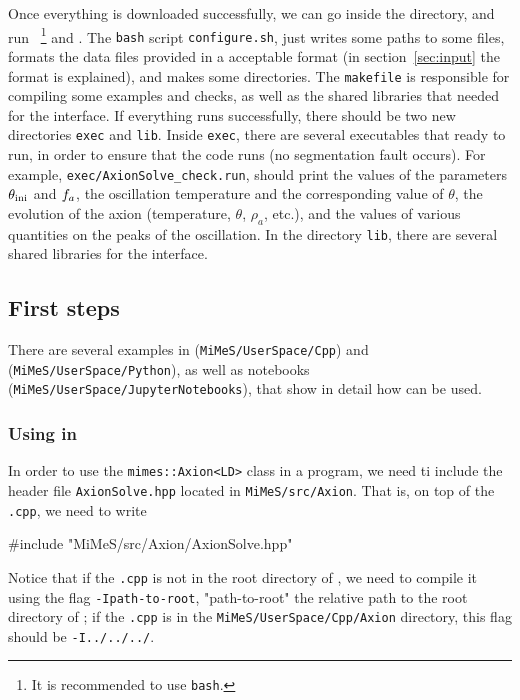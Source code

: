 \documentclass[11pt,a4paper]{article}
\begin{document}
Once everything is downloaded successfully, we can go inside the \mimes directory, and run ~\footnote{It is recommended to use {\tt bash}.} and .  The {\tt bash} script {\tt configure.sh}, just writes some paths to some files, formats the data files provided in a acceptable format (in section~\ref{sec:input} the format is explained), and makes some directories.
%
The {\tt makefile} is responsible for compiling some examples and checks, as well as the shared libraries that needed for the \PY interface.  If everything runs successfully, there should be two new directories {\tt exec} and {\tt lib}. Inside {\tt exec}, there are several executables that ready to run, in order to ensure that the code runs (\eg no segmentation fault occurs). For example, {\tt exec/AxionSolve\_check.run}, should print the values of the parameters $\theta_{\rm ini}{}$ and $f_{a}{}$, the oscillation temperature and the corresponding value of $\theta$, the evolution of the axion (\eg temperature, $\theta$, $\rho_{a}$, etc.), and the values of various quantities on the peaks of the oscillation.  In the directory {\tt lib}, there are several shared libraries for the \PY interface.

\subsection{First steps}\label{sec:first_steps} 
%
There are several examples in \CPP ({\tt MiMeS/UserSpace/Cpp}) and \PY ({\tt MiMeS/UserSpace/Python}), as well as \JUPY  notebooks ({\tt MiMeS/UserSpace/JupyterNotebooks}), that show in detail how \mimes can be used. 

\subsubsection{Using \mimes in \CPP} 
%
In order to use the {\tt mimes::Axion<LD>} class in a \CPP program, we need ti include the header file {\tt AxionSolve.hpp} located in {\tt MiMeS/src/Axion}. That is, on top of the {\tt .cpp}, we need to write 
%
\begin{cpp}
	#include "MiMeS/src/Axion/AxionSolve.hpp"
\end{cpp}
%
Notice that if the  {\tt .cpp} is not in the root directory of \mimes, we need to compile it using the flag {\tt -Ipath-to-root}, "path-to-root" the relative path to the root directory of \mimes; \eg if the {\tt .cpp} is in the {\tt MiMeS/UserSpace/Cpp/Axion} directory, this flag should be {\tt -I../../../}.
\end{document}

